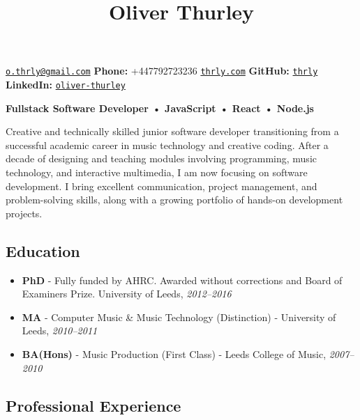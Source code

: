 \documentclass[11pt,a4paper]{article}
\title{\textcolor{devblue}{\large Oliver Thurley}}
\author{}
\date{}
\providecommand{\tightlist}{%
  \setlength{\itemsep}{0pt}\setlength{\parskip}{0pt}}
\begin{document}
\maketitle

\vspace{-1em}
\noindent\href{mailto:o.thrly@gmail.com}{\texttt{o.thrly@gmail.com}} \hspace{1em}
\textbf{Phone:} +447792723236 \hspace{1em}
\href{https://thrly.com}{\texttt{thrly.com}} \hspace{1em}
\textbf{GitHub:} \href{https://github.com/thrly}{\texttt{thrly}} \hspace{1em}
\textbf{LinkedIn:} \href{https://linkedin.com/in/oliver-thurley}{\texttt{oliver-thurley}}

\vspace{1em}

\textbf{Fullstack Software Developer • JavaScript • React • Node.js}

Creative and technically skilled junior software developer transitioning
from a successful academic career in music technology and creative
coding. After a decade of designing and teaching modules involving
programming, music technology, and interactive multimedia, I am now
focusing on software development. I bring excellent communication,
project management, and problem-solving skills, along with a growing
portfolio of hands-on development projects.

\subsection{Education}\label{education}

\begin{itemize}
\tightlist
\item
  \textbf{PhD} - Fully funded by AHRC. Awarded without corrections and
  Board of Examiners Prize. University of Leeds, \emph{2012--2016}
\item
  \textbf{MA} - Computer Music \& Music Technology (Distinction) -
  University of Leeds, \emph{2010--2011}
\item
  \textbf{BA(Hons)} - Music Production (First Class) - Leeds College of
  Music, \emph{2007--2010}
\end{itemize}

\subsection{Professional Experience}\label{professional-experience}
\end{document}
